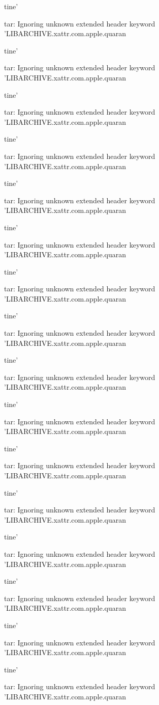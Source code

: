 \documentclass[11pt,a4paper]{article}
\begin{document}
tine'

tar: Ignoring unknown extended header keyword 'LIBARCHIVE.xattr.com.apple.quaran

tine'

tar: Ignoring unknown extended header keyword 'LIBARCHIVE.xattr.com.apple.quaran

tine'

tar: Ignoring unknown extended header keyword 'LIBARCHIVE.xattr.com.apple.quaran

tine'

tar: Ignoring unknown extended header keyword 'LIBARCHIVE.xattr.com.apple.quaran

tine'

tar: Ignoring unknown extended header keyword 'LIBARCHIVE.xattr.com.apple.quaran

tine'

tar: Ignoring unknown extended header keyword 'LIBARCHIVE.xattr.com.apple.quaran

tine'

tar: Ignoring unknown extended header keyword 'LIBARCHIVE.xattr.com.apple.quaran

tine'

tar: Ignoring unknown extended header keyword 'LIBARCHIVE.xattr.com.apple.quaran

tine'

tar: Ignoring unknown extended header keyword 'LIBARCHIVE.xattr.com.apple.quaran

tine'

tar: Ignoring unknown extended header keyword 'LIBARCHIVE.xattr.com.apple.quaran

tine'

tar: Ignoring unknown extended header keyword 'LIBARCHIVE.xattr.com.apple.quaran

tine'

tar: Ignoring unknown extended header keyword 'LIBARCHIVE.xattr.com.apple.quaran

tine'

tar: Ignoring unknown extended header keyword 'LIBARCHIVE.xattr.com.apple.quaran

tine'

tar: Ignoring unknown extended header keyword 'LIBARCHIVE.xattr.com.apple.quaran

tine'

tar: Ignoring unknown extended header keyword 'LIBARCHIVE.xattr.com.apple.quaran

tine'

tar: Ignoring unknown extended header keyword 'LIBARCHIVE.xattr.com.apple.quaran
\end{document}
